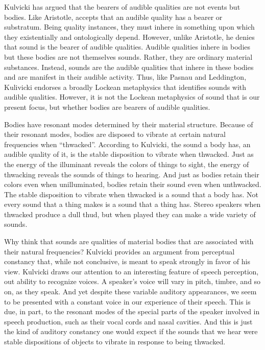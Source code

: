 \documentclass[12pt]{article}
\begin{document}
Kulvicki has argued that the bearers of audible qualities are not events but bodies. Like Aristotle, accepts that an audible quality has a bearer or substratum. Being quality instances, they must inhere in something upon which they existentially and ontologically depend. However, unlike Aristotle, he denies that sound is the bearer of audible qualities. Audible qualities inhere in bodies but these bodies are not themselves sounds. Rather, they are ordinary material substances. Instead, sounds are the audible qualities that inhere in these bodies and are manifest in their audible activity. Thus, like Pasnau and Leddington, Kulivicki endorses a broadly Lockean metaphysics that identifies sounds with audible qualities. However, it is not the Lockean metaphysics of sound that is our present focus, but whether bodies are bearers of audible qualities.

Bodies have resonant modes determined by their material structure. Because of their resonant modes, bodies are disposed to vibrate at certain natural frequencies when “thwacked”. According to Kulvicki, the sound a body has, an audible quality of it, is the stable disposition to vibrate when thwacked. Just as the energy of the illuminant reveals the colors of things to sight, the energy of thwacking reveals the sounds of things to hearing. And just as bodies retain their colors even when unilluminated, bodies retain their sound even when unthwacked. The stable disposition to vibrate when thwacked is a sound that a body has. Not every sound that a thing makes is a sound that a thing has. Stereo speakers when thwacked produce a dull thud, but when played they can make a wide variety of sounds.

Why think that sounds are qualities of material bodies that are associated with their natural frequencies? Kulvicki provides an argument from perceptual constancy that, while not conclusive, is meant to speak strongly in favor of his view. Kulvicki draws our attention to an interesting feature of speech perception, out ability to recognize voices. A speaker’s voice will vary in pitch, timbre, and so on, as they speak. And yet despite these variable auditory appearances, we seem to be presented with a constant voice in our experience of their speech. This is due, in part, to the resonant modes of the special parts of the speaker involved in speech production, such as their vocal cords and nasal cavities. And this is just the kind of auditory constancy one would expect if the sounds that we hear were stable dispositions of objects to vibrate in response to being thwacked.
\end{document}
